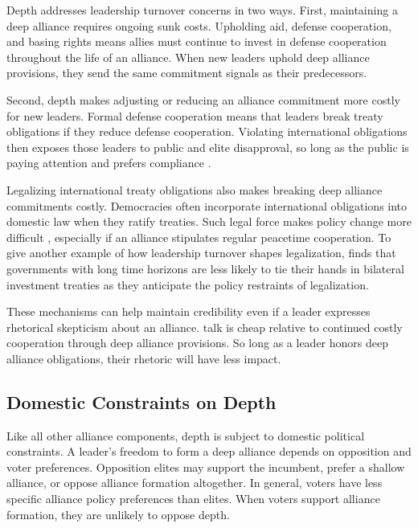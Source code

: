 \documentclass[12pt]{article}
\begin{document}
Depth addresses leadership turnover concerns in two ways. 
First, maintaining a deep alliance requires ongoing sunk costs.
Upholding aid, defense cooperation, and basing rights means allies must continue to invest in defense cooperation throughout the life of an alliance. 
When new leaders uphold deep alliance provisions, they send the same commitment signals as their predecessors. 


Second, depth makes adjusting or reducing an alliance commitment more costly for new leaders. 
Formal defense cooperation means that leaders break treaty obligations if they reduce defense cooperation. 
Violating international obligations then exposes those leaders to public and elite disapproval, so long as the public is paying attention \citep{Slantchev2006, PotterBaum2014} and prefers compliance \citep{Chaudoin2014, KertzerBrutger2016}.


Legalizing international treaty obligations also makes breaking deep alliance commitments costly. 
Democracies often incorporate international obligations into domestic law when they ratify treaties.
Such legal force makes policy change more difficult \citep{Gaubatz1996, Leedsetal2009}, especially if an alliance stipulates regular peacetime cooperation. 
To give another example of how leadership turnover shapes legalization, \citet{Blake2013} finds that governments with long time horizons are less likely to tie their hands in bilateral investment treaties as they anticipate the policy restraints of legalization. 


These mechanisms can help maintain credibility even if a leader expresses rhetorical skepticism about an alliance. 
talk is cheap relative to continued costly cooperation through deep alliance provisions. 
So long as a leader honors deep alliance obligations, their rhetoric will have less impact. 



\subsection{Domestic Constraints on Depth} 

Like all other alliance components, depth is subject to domestic political constraints. 
A leader's freedom to form a deep alliance depends on opposition and voter preferences.
Opposition elites may support the incumbent, prefer a shallow alliance, or oppose alliance formation altogether. 
In general, voters have less specific alliance policy preferences than elites. 
When voters support alliance formation, they are unlikely to oppose depth.
\end{document}

